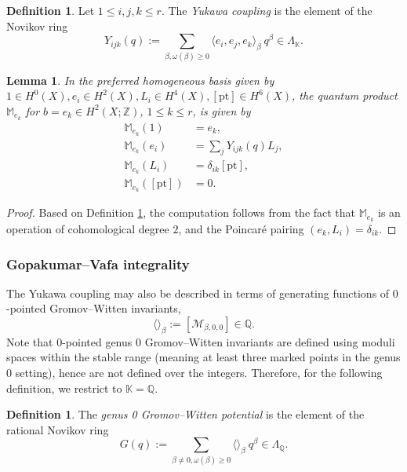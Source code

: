 \documentclass[reqno]{amsart}
\numberwithin{equation}{section}
\numberwithin{equation}{section}
\numberwithin{equation}{section}
\newtheorem{lemma}[thm]{Lemma}
\theoremstyle{definition}
\newtheorem{defn}[thm]{Definition}
\theoremstyle{remark}
\theoremstyle{remark}
\begin{document}
\begin{defn}\label{defn:yukawa}
    Let $1 \le i, j, k \le r$. The \emph{Yukawa coupling} is the element of the Novikov ring
    \begin{equation}
        Y_{ijk}(q) := \sum_{\beta, \omega(\beta) \ge 0} \langle e_i, e_j, e_k \rangle_{\beta}  \ q^\beta \in \Lambda_{\mathbb{K}}.
    \end{equation}
\end{defn}

\begin{lemma}\label{lem:qproduct-computation}
In the preferred homogeneous basis given by $1 \in H^0(X), e_i \in H^2(X), L_i \in H^4(X), [\mathrm{pt}] \in H^6(X)$, the quantum product $\mathbb{M}_{e_k}$ for $b = e_k \in H^2(X;\mathbb{Z})$, $1 \le k \le r$, is given by
\begin{align} \label{eq:matricesquantumproduct}
\mathbb{M}_{e_k} (1) &= e_k, \\
\mathbb{M}_{e_k} (e_i) &=  \sum_{j} Y_{ijk}(q) L_j ,\nonumber \\
\mathbb{M}_{e_k}(L_i) &= \delta_{ik} [\mathrm{pt}], \\
\mathbb{M}_{e_k} ([\mathrm{pt}])&= 0 \nonumber  .
\end{align}
\end{lemma}
\begin{proof}
Based on Definition \ref{defn:yukawa}, the computation follows from the fact that $\mathbb{M}_{e_k}$ is an operation of cohomological degree $2$, and the Poincar\'e pairing $(e_k, L_i) = \delta_{ik}$. 
\end{proof}

\subsubsection{Gopakumar--Vafa integrality}
The Yukawa coupling may also be described in terms of generating functions of $0$-pointed Gromov--Witten invariants,
\begin{equation}
    \langle \rangle_\beta := [\mathcal{M}_{\beta, 0, 0}] \in \mathbb{Q}.
\end{equation}
Note that $0$-pointed genus $0$ Gromov--Witten invariants are defined using moduli spaces within the stable range (meaning at least three marked points in the genus $0$ setting), hence are not defined over the integers. Therefore, for the following definition, we restrict to $\mathbb{K} = \mathbb{Q}$.


\begin{defn}\label{defn:gw-potential}
    The \emph{genus 0 Gromov--Witten potential} is the element of the rational Novikov ring
    \begin{equation}
        G(q) := \sum_{\beta \neq 0, \omega(\beta) \ge 0} \langle \rangle_{\beta} \ q^\beta \in \Lambda_{\mathbb{Q}}.
    \end{equation}
\end{defn}
\end{document}

